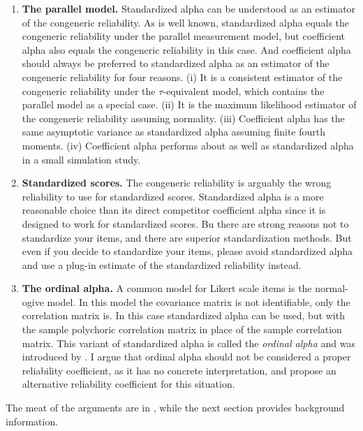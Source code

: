 \documentclass[twoside]{article}
\begin{document}
\begin{enumerate}[label=(\Alph*)]

\item \textbf{The parallel model.} Standardized alpha can be understood as an estimator of the congeneric reliability. As is well known, standardized alpha equals the congeneric reliability under the parallel measurement model, but coefficient alpha also equals the congeneric reliability in this case. And coefficient alpha should always be preferred to standardized alpha as an estimator of the congeneric reliability for four reasons. (i) It is a consistent estimator of the congeneric reliability under the $\tau$-equivalent model, which contains the parallel model as a special case. (ii) It is the maximum likelihood estimator of the congeneric reliability assuming normality. (iii) Coefficient alpha has the same asymptotic variance as standardized alpha assuming finite fourth moments. (iv) Coefficient alpha performs about as well as standardized alpha in a small simulation study.
\item \textbf{Standardized scores.} The congeneric reliability is arguably the wrong reliability to use for standardized scores. Standardized alpha is a more reasonable choice than its direct competitor coefficient alpha since it is designed to work for standardized scores. Bu there are strong reasons not to standardize your items, and there are superior standardization methods. But even if you decide to standardize your items, please avoid standardized alpha and use a plug-in estimate of the standardized reliability instead.
\item \textbf{The ordinal alpha.} A common model for Likert scale items is the normal-ogive model. In this model the covariance matrix is not identifiable, only the correlation matrix is. In this case standardized alpha can be used, but with the sample polychoric correlation matrix in place of the sample correlation matrix. This variant of standardized alpha is called the \textit{ordinal alpha} and was introduced by \citet{Zumbo2007-ap}. I argue that ordinal alpha should not be considered a proper reliability coefficient, as it has no concrete interpretation, and propose an alternative reliability coefficient for this situation.
\end{enumerate}

The meat of the arguments are in , while the next section provides background information.

\end{document}
